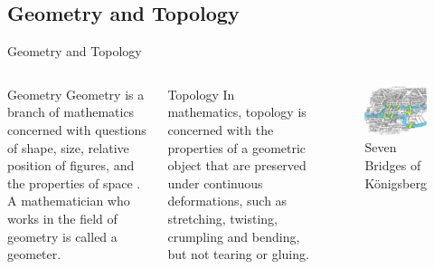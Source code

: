 \subsection{Geometry and Topology}
\begin{frame}{Geometry and Topology}
    \begin{columns}
            \begin{block}{Geometry}
            Geometry 
            is a branch of mathematics concerned with questions of shape, size, relative position of figures, and the properties of space \cite{de2015mathematizing}. A mathematician who works in the field of geometry is called a geometer.
            \end{block}
            \begin{block}{Topology}
            In mathematics, topology 
            is concerned with the properties of a geometric object that are preserved under continuous deformations, such as stretching, twisting, crumpling and bending, but not tearing or gluing.
            \end{block}
            \begin{figure}
                \centering
                \includegraphics[width=\textwidth]{figs/Konigsberg_bridges.png}
                \caption{Seven Bridges of Königsberg 
                    \cite{euler1953leonhard, euler1741solutio,wiki:7bridges}
                }
            \end{figure}
    \end{columns}
    
    
\end{frame}


